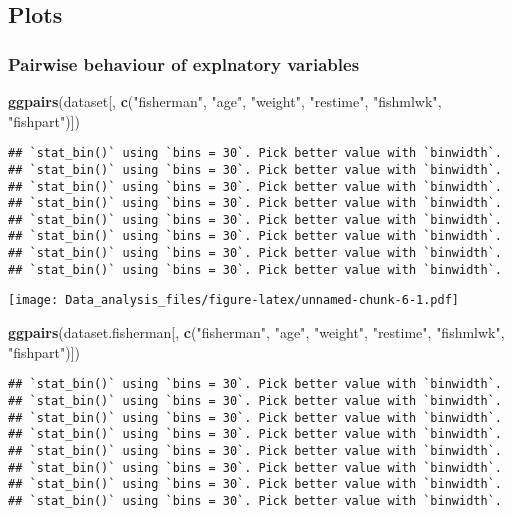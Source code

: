 \documentclass[12pt,]{article}
\newenvironment{Shaded}{\begin{snugshade}}{\end{snugshade}}
\newcommand{\KeywordTok}[1]{\textcolor[rgb]{0.13,0.29,0.53}{\textbf{#1}}}
\newcommand{\StringTok}[1]{\textcolor[rgb]{0.31,0.60,0.02}{#1}}
\newcommand{\NormalTok}[1]{#1}
\begin{document}
\subsection{Plots}\label{plots}

\subsubsection{Pairwise behaviour of explnatory
variables}\label{pairwise-behaviour-of-explnatory-variables}

\begin{Shaded}
\begin{Highlighting}[]
\KeywordTok{ggpairs}\NormalTok{(dataset[, }\KeywordTok{c}\NormalTok{(}\StringTok{"fisherman"}\NormalTok{, }\StringTok{"age"}\NormalTok{, }\StringTok{"weight"}\NormalTok{, }\StringTok{"restime"}\NormalTok{, }\StringTok{"fishmlwk"}\NormalTok{, }\StringTok{"fishpart"}\NormalTok{)])}
\end{Highlighting}
\end{Shaded}

\begin{verbatim}
## `stat_bin()` using `bins = 30`. Pick better value with `binwidth`.
## `stat_bin()` using `bins = 30`. Pick better value with `binwidth`.
## `stat_bin()` using `bins = 30`. Pick better value with `binwidth`.
## `stat_bin()` using `bins = 30`. Pick better value with `binwidth`.
## `stat_bin()` using `bins = 30`. Pick better value with `binwidth`.
## `stat_bin()` using `bins = 30`. Pick better value with `binwidth`.
## `stat_bin()` using `bins = 30`. Pick better value with `binwidth`.
## `stat_bin()` using `bins = 30`. Pick better value with `binwidth`.
\end{verbatim}

\texttt{[image: Data\_analysis\_files/figure-latex/unnamed-chunk-6-1.pdf]}

\begin{Shaded}
\begin{Highlighting}[]
\KeywordTok{ggpairs}\NormalTok{(dataset.fisherman[, }\KeywordTok{c}\NormalTok{(}\StringTok{"fisherman"}\NormalTok{, }\StringTok{"age"}\NormalTok{, }\StringTok{"weight"}\NormalTok{, }\StringTok{"restime"}\NormalTok{, }\StringTok{"fishmlwk"}\NormalTok{, }\StringTok{"fishpart"}\NormalTok{)])}
\end{Highlighting}
\end{Shaded}

\begin{verbatim}
## `stat_bin()` using `bins = 30`. Pick better value with `binwidth`.
## `stat_bin()` using `bins = 30`. Pick better value with `binwidth`.
## `stat_bin()` using `bins = 30`. Pick better value with `binwidth`.
## `stat_bin()` using `bins = 30`. Pick better value with `binwidth`.
## `stat_bin()` using `bins = 30`. Pick better value with `binwidth`.
## `stat_bin()` using `bins = 30`. Pick better value with `binwidth`.
## `stat_bin()` using `bins = 30`. Pick better value with `binwidth`.
## `stat_bin()` using `bins = 30`. Pick better value with `binwidth`.
\end{verbatim}
\end{document}
